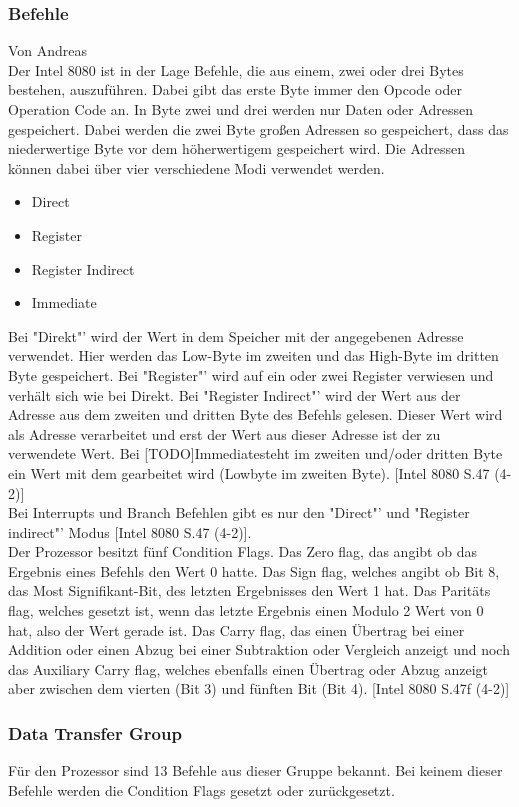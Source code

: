 \documentclass[12pt]{article}
\begin{document}
\subsubsection{Befehle}
Von Andreas\\ \noindent
Der Intel 8080 ist in der Lage Befehle, die aus einem, zwei oder drei Bytes bestehen, auszuführen. Dabei gibt das erste Byte immer den Opcode oder Operation Code an. In Byte zwei und drei werden nur Daten oder Adressen gespeichert. Dabei werden die zwei Byte großen Adressen so gespeichert, dass das niederwertige Byte vor dem höherwertigem gespeichert wird. Die Adressen können dabei über vier verschiedene Modi verwendet werden.
\begin{itemize}
\item Direct
\item Register
\item Register Indirect
\item Immediate
\end{itemize}\noindent
Bei "Direkt"' wird der Wert in dem Speicher mit der angegebenen Adresse verwendet. Hier werden das Low-Byte im zweiten und das High-Byte im dritten Byte gespeichert. Bei "Register"' wird auf ein oder zwei Register verwiesen und verhält sich wie bei Direkt. Bei "Register Indirect"' wird der Wert aus der Adresse aus dem zweiten und dritten Byte des Befehls gelesen. Dieser Wert wird als Adresse verarbeitet und erst der Wert aus dieser Adresse ist der zu verwendete Wert. Bei [TODO]\glqq Immediate\grqq steht 
im zweiten und/oder dritten Byte ein Wert mit dem gearbeitet wird (Lowbyte im zweiten Byte). [Intel 8080 S.47 (4-2)]
\\ \noindent
Bei Interrupts und Branch Befehlen gibt es nur den "Direct"' und "Register indirect"' Modus [Intel 8080 S.47 (4-2)]. 
\\ \noindent
Der Prozessor besitzt fünf Condition Flags. Das Zero flag, das angibt ob das Ergebnis eines Befehls den Wert 0 hatte. Das Sign flag, welches angibt ob Bit 8, das Most Signifikant-Bit, des letzten Ergebnisses den Wert 1 hat. Das Paritäts flag, welches gesetzt ist, wenn das letzte Ergebnis einen Modulo 2 Wert von 0 hat, also der Wert gerade ist. Das Carry flag, das einen Übertrag bei einer Addition oder einen Abzug bei einer Subtraktion oder Vergleich anzeigt und noch das Auxiliary Carry flag, welches ebenfalls einen Übertrag oder Abzug anzeigt aber zwischen dem vierten (Bit 3) und fünften Bit (Bit 4). [Intel 8080 S.47f (4-2)]
\\

\subsubsection{Data Transfer Group}
Für den Prozessor sind 13 Befehle aus dieser Gruppe bekannt. Bei keinem dieser Befehle werden die Condition Flags gesetzt oder zurückgesetzt.
\end{document}
